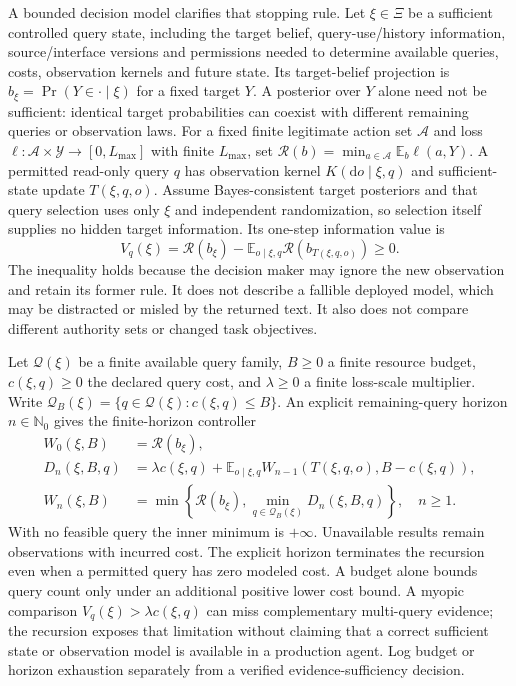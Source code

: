 A bounded decision model clarifies that stopping rule. Let $\xi\in\Xi$ be a sufficient controlled query state, including the target belief, query-use/history information, source/interface versions and permissions needed to determine available queries, costs, observation kernels and future state. Its target-belief projection is $b_\xi=\Pr(Y\in\cdot\mid\xi)$ for a fixed target $Y$. A posterior over $Y$ alone need not be sufficient: identical target probabilities can coexist with different remaining queries or observation laws. For a fixed finite legitimate action set $\mathcal A$ and loss $\ell:\mathcal A\times\mathcal Y\to[0,L_{\max}]$ with finite $L_{\max}$, set $\mathcal R(b)=\min_{a\in\mathcal A}\mathbb E_b\ell(a,Y)$. A permitted read-only query $q$ has observation kernel $K(\mathrm d o\mid\xi,q)$ and sufficient-state update $T(\xi,q,o)$. Assume Bayes-consistent target posteriors and that query selection uses only $\xi$ and independent randomization, so selection itself supplies no hidden target information. Its one-step information value is
\begin{equation}
 V_q(\xi)=\mathcal R(b_\xi)-
 \mathbb E_{o\mid\xi,q}\mathcal R(b_{T(\xi,q,o)})\geq0.
\end{equation}
The inequality holds because the decision maker may ignore the new observation and retain its former rule. It does not describe a fallible deployed model, which may be distracted or misled by the returned text. It also does not compare different authority sets or changed task objectives.

Let $\mathcal Q(\xi)$ be a finite available query family, $B\geq0$ a finite resource budget, $c(\xi,q)\geq0$ the declared query cost, and $\lambda\geq0$ a finite loss-scale multiplier. Write $\mathcal Q_B(\xi)=\{q\in\mathcal Q(\xi):c(\xi,q)\leq B\}$. An explicit remaining-query horizon $n\in\mathbb N_0$ gives the finite-horizon controller
\begin{equation}
\begin{aligned}
 W_0(\xi,B)&=\mathcal R(b_\xi),\\
 D_n(\xi,B,q)&=\lambda c(\xi,q)+\mathbb E_{o\mid\xi,q}
 W_{n-1}(T(\xi,q,o),B-c(\xi,q)),\\
 W_n(\xi,B)&=\min\!\left\{\mathcal R(b_\xi),
 \min_{q\in\mathcal Q_B(\xi)}D_n(\xi,B,q)\right\},\quad n\geq1.
\end{aligned}
\end{equation}
With no feasible query the inner minimum is $+\infty$. Unavailable results remain observations with incurred cost. The explicit horizon terminates the recursion even when a permitted query has zero modeled cost. A budget alone bounds query count only under an additional positive lower cost bound. A myopic comparison $V_q(\xi)>\lambda c(\xi,q)$ can miss complementary multi-query evidence; the recursion exposes that limitation without claiming that a correct sufficient state or observation model is available in a production agent. Log budget or horizon exhaustion separately from a verified evidence-sufficiency decision.

